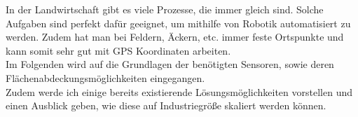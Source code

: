 
	In der Landwirtschaft gibt es viele Prozesse, die immer gleich sind. Solche Aufgaben sind perfekt dafür geeignet, um mithilfe von Robotik automatisiert zu werden. Zudem hat man bei Feldern, Äckern, etc. immer feste Ortspunkte und kann somit sehr gut mit GPS Koordinaten arbeiten.\\
	Im Folgenden wird auf die Grundlagen der benötigten Sensoren, sowie deren Flächenabdeckungsmöglichkeiten eingegangen.\\                                         Zudem werde ich einige bereits existierende Lösungsmöglichkeiten vorstellen und einen Ausblick geben, wie diese auf Industriegröße skaliert werden können.
	
